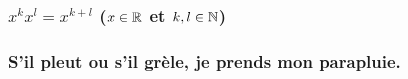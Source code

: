 \documentclass[french,t,handout,xcolor=svgnames]{beamer}
\begin{document}
\begin{frame}
  \frametitle{$x^{k}x^{l} = x^{k+l}$ ($x\in\mathbb{R}$ et $k,l \in \mathbb{N}$)}
  
\end{frame}
\begin{frame}
  \frametitle{S'il pleut ou s'il grèle, je prends mon parapluie.}
  
\end{frame}
  
  
\end{document}
